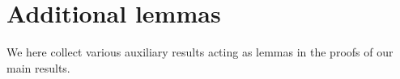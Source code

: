 \documentclass[11pt]{article}
\def\R{\mathbb{R}}
\def\tr{\mathrm{tr}}
\begin{document}


%


\section{Additional lemmas}\label{app:aux}
We here collect various auxiliary results acting as lemmas in the proofs of our main results.
\end{document}
